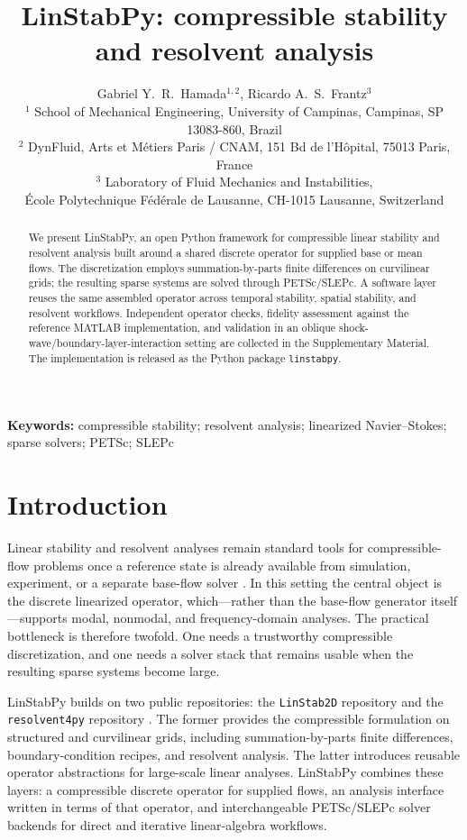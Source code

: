\documentclass[10pt]{article}
\title{LinStabPy: compressible stability and resolvent analysis}
\author{%
Gabriel Y.~R.~Hamada$^{1,2}$, Ricardo A.~S.~Frantz$^{3}$\\[0.75em]
\small $^{1}$ School of Mechanical Engineering, University of Campinas, Campinas, SP 13083-860, Brazil\\
\small $^{2}$ DynFluid, Arts et M\'etiers Paris / CNAM, 151 Bd de l'H\^opital, 75013 Paris, France\\
\small $^{3}$ Laboratory of Fluid Mechanics and Instabilities,\\
\small \'Ecole Polytechnique F\'ed\'erale de Lausanne, CH-1015 Lausanne, Switzerland%
}
\date{}
\begin{document}
\maketitle

\begin{abstract}
We present LinStabPy, an open Python framework for compressible linear
stability and resolvent analysis built around a shared discrete operator for
supplied base or mean flows. The discretization employs summation-by-parts finite differences on
curvilinear grids; the resulting sparse systems are solved through
PETSc/SLEPc.
A software layer reuses the same assembled operator across temporal stability,
spatial stability, and resolvent workflows. Independent operator checks,
fidelity assessment against the reference MATLAB implementation, and validation
in an oblique shock-wave/boundary-layer-interaction setting are collected in
the Supplementary Material. The implementation is released as the Python
package \texttt{linstabpy}.
\end{abstract}

\noindent\textbf{Keywords:} compressible stability; resolvent analysis;
linearized Navier--Stokes; sparse solvers; PETSc; SLEPc

\section{Introduction}

Linear stability and resolvent analyses remain standard tools for
compressible-flow problems once a reference state is already available from
simulation, experiment, or a separate base-flow solver
\citep{schmid2001stability,theofilis2011global,mckeon2010critical,towne2018spectral}.
In this setting the central object is the discrete linearized
operator, which---rather than the base-flow generator itself---supports
modal, nonmodal, and frequency-domain analyses.
The practical bottleneck is therefore twofold. One needs a trustworthy
compressible discretization, and one needs a solver stack that remains usable
when the resulting sparse systems become large.

LinStabPy builds on two public repositories: the
\texttt{LinStab2D} repository \citep{linstab2drepo,martini2024} and the
\texttt{resolvent4py} repository
\citep{resolvent4pyrepo,padovan2025resolvent4py,resolvent4pycgl}. The former provides the
compressible formulation on structured and curvilinear grids, including
summation-by-parts finite differences, boundary-condition recipes, and
resolvent analysis. The latter introduces reusable operator
abstractions for large-scale linear analyses. LinStabPy combines these layers:
a compressible discrete operator for supplied flows, an analysis interface
written in terms of that operator, and interchangeable PETSc/SLEPc solver
backends for direct and iterative linear-algebra workflows.
\end{document}
